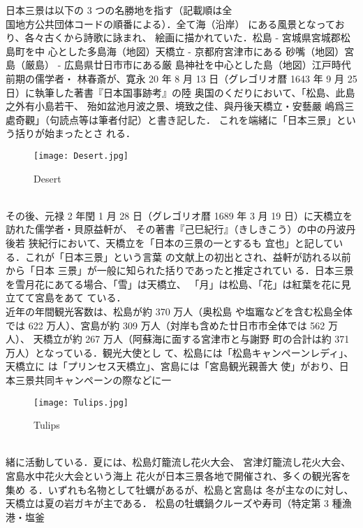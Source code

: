 \documentclass[twocolumn]{jarticle}
\begin{document}
日本三景は以下の 3 つの名勝地を指す（記載順は全\\
国地方公共団体コードの順番による）．全て海（沿岸）
にある風景となっており、各々古くから詩歌に詠まれ、
絵画に描かれていた．松島 - 宮城県宮城郡松島町を中
心とした多島海（地図）天橋立 - 京都府宮津市にある
砂嘴（地図）宮島（厳島） - 広島県廿日市市にある厳
島神社を中心とした島（地図）江戸時代前期の儒学者・
林春斎が、寛永 20 年 8 月 13 日（グレゴリオ暦 1643
年 9 月 25 日）に執筆した著書『日本国事跡考』の陸
奥国のくだりにおいて、「松島、此島之外有小島若干、
殆如盆池月波之景、境致之佳、與丹後天橋立・安藝嚴
嶋爲三處奇觀」（句読点等は筆者付記）と書き記した．
これを端緒に「日本三景」という括りが始まったとさ
れる．\\
\begin{figure}[htbp]
\begin{center}
\texttt{[image: Desert.jpg]}
\caption{ Desert}
\end{center}
\end{figure}\\
 その後、元禄 2 年閏 1 月 28 日（グレゴリオ暦 1689
年 3 月 19 日）に天橋立を訪れた儒学者・貝原益軒が、
その著書『己巳紀行』（きしきこう）の中の丹波丹後若
狭紀行において、天橋立を「日本の三景の一とするも
宜也」と記している．これが「日本三景」という言葉
の文献上の初出とされ、益軒が訪れる以前から「日本
三景」が一般に知られた括りであったと推定されてい
る．日本三景を雪月花にあてる場合、「雪」は天橋立、
「月」は松島、「花」は紅葉を花に見立てて宮島をあて
ている．\\
 近年の年間観光客数は、松島が約 370 万人（奥松島
や塩竈などを含む松島全体では 622 万人）、宮島が約
309 万人（対岸も含めた廿日市市全体では 562 万人）、
天橋立が約 267 万人（阿蘇海に面する宮津市と与謝野
町の合計は約 371 万人）となっている．観光大使とし
て、松島には「松島キャンペーンレディ」、天橋立に
は「プリンセス天橋立」、宮島には「宮島観光親善大
使」がおり、日本三景共同キャンペーンの際などに一
\begin{figure}[htbp]
\begin{center}
\texttt{[image: Tulips.jpg]}
\caption{ Tulips}
\end{center}
\end{figure}\\
緒に活動している．夏には、松島灯籠流し花火大会、
宮津灯籠流し花火大会、宮島水中花火大会という海上
花火が日本三景各地で開催され、多くの観光客を集め
る．いずれも名物として牡蠣があるが、松島と宮島は
冬が主なのに対し、天橋立は夏の岩ガキが主である．
松島の牡蠣鍋クルーズや寿司（特定第 3 種漁港・塩釜
\end{document}
